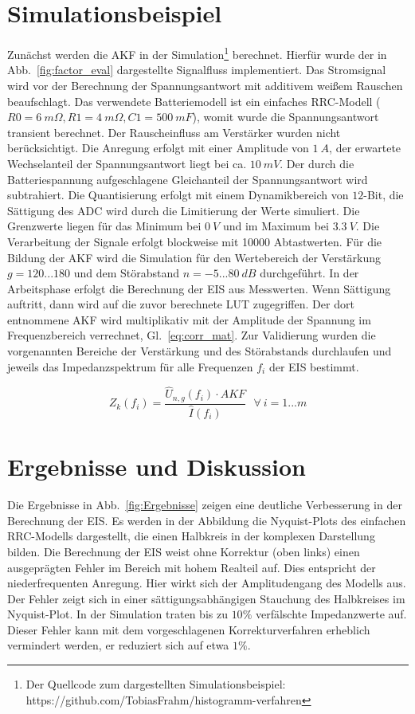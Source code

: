 \smallskip
\section{Simulationsbeispiel}
Zunächst werden die AKF in der Simulation\footnote[2]{Der Quellcode zum dargestellten Simulationsbeispiel: https://github.com/TobiasFrahm/histogramm-verfahren} berechnet. Hierfür wurde der in Abb.~\ref{fig:factor_eval} dargestellte Signalfluss implementiert. Das Stromsignal wird vor der Berechnung der Spannungsantwort mit additivem weißem Rauschen beaufschlagt. Das verwendete Batteriemodell ist ein einfaches RRC-Modell ($R0 = \SI{6}{m\Omega}, R1=\SI{4}{m\Omega}, C1=\SI{500}{mF}$), womit wurde die Spannungsantwort transient berechnet. Der Rauscheinfluss am Verstärker wurden nicht berücksichtigt. Die Anregung erfolgt mit einer Amplitude von $\SI{1}{A}$, der erwartete Wechselanteil der Spannungsantwort liegt bei ca. $\SI{10}{mV}$. Der durch die Batteriespannung aufgeschlagene Gleichanteil der Spannungsantwort wird subtrahiert. Die Quantisierung erfolgt mit einem Dynamikbereich von $12$-Bit, die Sättigung des ADC wird durch die Limitierung der Werte simuliert. Die Grenzwerte liegen für das Minimum bei $\SI{0}{V}$ und im Maximum bei $\SI{3.3}{V}$. Die Verarbeitung der Signale erfolgt blockweise mit 10000 Abtastwerten. Für die Bildung der AKF wird die Simulation für den Wertebereich der Verstärkung $g = 120 ... 180$ und dem Störabstand $n = -5 ... \SI{80}{dB}$ durchgeführt. In der Arbeitsphase erfolgt die Berechnung der EIS aus Messwerten. Wenn Sättigung auftritt, dann wird auf die zuvor berechnete LUT zugegriffen. Der dort entnommene AKF wird multiplikativ mit der Amplitude der Spannung im Frequenzbereich verrechnet, Gl.~\eqref{eq:corr_mat}. Zur Validierung wurden die vorgenannten Bereiche der Verstärkung und des Störabstands durchlaufen und jeweils das Impedanzspektrum für alle Frequenzen $f_i$ der EIS bestimmt.

\begin{equation}
	\label{eq:corr_mat}
	Z_k(f_i) = \frac{\hat{U}_{n,g}(f_i) \cdot AKF}{\hat{I}(f_i)}~~~\forall~i = 1...m
\end{equation}	


\section{Ergebnisse und Diskussion}
Die Ergebnisse in Abb.~\ref{fig:Ergebnisse} zeigen eine deutliche Verbesserung in der Berechnung der EIS. Es werden in der Abbildung die Nyquist-Plots des einfachen RRC-Modells dargestellt, die einen Halbkreis in der komplexen Darstellung bilden. 
Die Berechnung der EIS weist ohne Korrektur (oben links) einen ausgeprägten Fehler im Bereich mit hohem Realteil auf. Dies entspricht der niederfrequenten Anregung. Hier wirkt sich der Amplitudengang des Modells aus. Der Fehler zeigt sich in einer sättigungsabhängigen Stauchung des Halbkreises im Nyquist-Plot. In der Simulation traten bis zu $10\%$ verfälschte Impedanzwerte auf. Dieser Fehler kann mit dem vorgeschlagenen Korrekturverfahren erheblich vermindert werden, er reduziert sich auf etwa $1\%$. 


